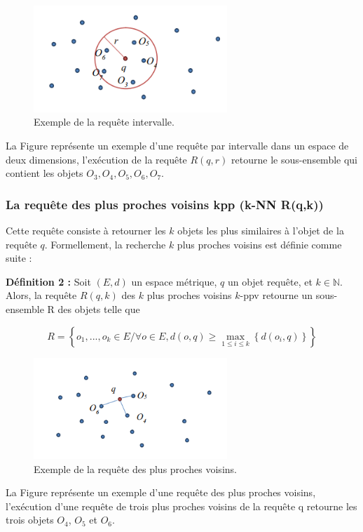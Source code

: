 \begin{figure}[H]
	\centering
	\includegraphics[width=0.65\textwidth]{Figures/rangeQ} %
	\caption{Exemple de la requête intervalle.}
\end{figure}
La Figure représente un exemple d’une requête par intervalle dans un espace de
deux dimensions, l’exécution de la requête $ R(q,r) $ retourne le sous-ensemble qui contient les objets $ {O_3,O_4,O_5,O_6,O_7} $.

\subsubsection{La requête des plus proches voisins kpp (k-NN R(q,k))}
Cette requête consiste à retourner les $ k $ objets les plus similaires à l’objet de la requête $ q $. Formellement, la recherche $ k $ plus proches voisins est définie comme suite :

\textbf{Définition 2 :} Soit $ (E,d ) $ un espace métrique, $ q $ un objet requête, et $ k \in \mathbb{N} $. Alors, la requête  $ R(q,k) $ des $ k $ plus proches voisins $ k $-ppv retourne un sous-ensemble R des objets telle que

\begin{equation}
R = \left\{ o_1,...,o_k \in E / \forall o \in E, d(o, q) \ge \max_{1\leq i \leq k}\left\{d(o_i, q)\right\}  \right\}
\end{equation}

\begin{figure}[H]
	\centering
	\includegraphics[width=0.65\textwidth]{Figures/knnQ} %
	\caption{Exemple de la requête des plus proches voisins.}
\end{figure}
La Figure représente un exemple d’une requête des plus proches voisins,
l’exécution d’une requête de trois plus proches voisins de la requête q retourne les trois objets $ O_4 $, $ O_5 $ et $ O_6 $.

